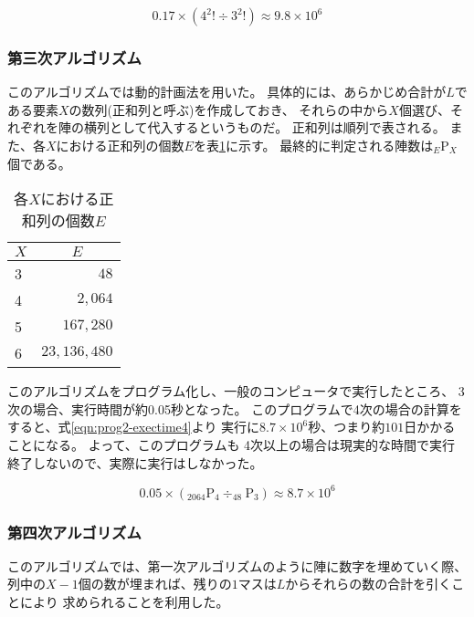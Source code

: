 {\begin{equation} \label{eqn:prog1.5-exectime4}
0.17 \times (4^2! \div 3^2!) \approx 9.8 \times 10^6
\end{equation}

\subsubsection{第三次アルゴリズム}
このアルゴリズムでは動的計画法を用いた。
具体的には、あらかじめ合計が$L$である要素$X$の数列(正和列と呼ぶ)を作成しておき、
それらの中から$X$個選び、それぞれを陣の横列として代入するというものだ。
正和列は順列で表される。
また、各$X$における正和列の個数$E$を表\ref{tab:ple-each-X}に示す。
最終的に判定される陣数は$_E \mathrm{P} _X$個である。

\begin{table}[htb]
	\begin{center}
	\begin{tabular}{|l|r|}
\hline \hline
\multicolumn{1}{|c|}{$X$} & \multicolumn{1}{|c|}{$E$} \\
\hline \hline
3 & $48$ \\
4 & $2,064$ \\
5 & $167,280$ \\
6 & $23,136,480$ \\
\hline
	\end{tabular}
	\end{center}
	\caption{各$X$における正和列の個数$E$}
	\label{tab:ple-each-X}
\end{table}

このアルゴリズムをプログラム化し、一般のコンピュータで実行したところ、
3次の場合、実行時間が約0.05秒となった。
このプログラムで4次の場合の計算をすると、式\ref{eqn:prog2-exectime4}より
実行に$8.7 \times 10^6$秒、つまり約$101$日かかることになる。
よって、このプログラムも
4次以上の場合は現実的な時間で実行終了しないので、実際に実行はしなかった。

\begin{equation} \label{eqn:prog2-exectime4}
0.05 \times (_{2064} \mathrm{P} _4 \div _{48} \mathrm{P} _3) \approx 8.7 \times 10^6
\end{equation}

\subsubsection{第四次アルゴリズム}
このアルゴリズムでは、第一次アルゴリズムのように陣に数字を埋めていく際、
列中の$X-1$個の数が埋まれば、残りの$1$マスは$L$からそれらの数の合計を引くことにより
求められることを利用した。

}
